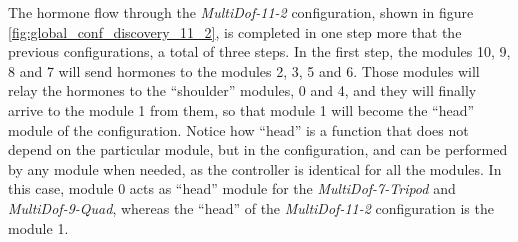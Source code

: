 The hormone flow through the \emph{MultiDof-11-2} configuration, shown in figure \ref{fig:global_conf_discovery_11_2}, is completed in one step more that the previous configurations, a total of three steps. In the first step, the modules 10, 9, 8 and 7 will send hormones to the modules 2, 3, 5 and 6. Those modules will relay the hormones to the ``shoulder'' modules, 0 and 4, and they will finally arrive to the module 1 from them, so that module 1 will become the ``head'' module of the configuration. Notice how ``head'' is a function that does not depend on the particular module, but in the configuration, and can be performed by any module when needed, as the controller is identical for all the modules. In this case, module 0 acts as ``head'' module for the \emph{MultiDof-7-Tripod} and \emph{MultiDof-9-Quad}, whereas the ``head'' of the \emph{MultiDof-11-2} configuration is the module 1.\\
